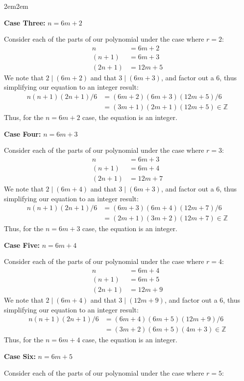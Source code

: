 \documentclass[10pt,oneside]{book}
\newcommand{\Z}{\mathbb{Z}}\newcommand{\R}{\mathbb{R}}\newcommand{\N}{\mathbb{N}}
\newcommand{\centerit}[1]{{\begin{center} #1 \end{center}}}
\let\endoldproof\endproof
\renewenvironment{proof}[1][\proofname]
  {\vspace{0.2cm}\begin{adjustwidth}{2em}{2em}
   \oldproof[#1]}
  {\endoldproof
   \end{adjustwidth}}
\begin{document}
\begin{enumerate}
\begin{proof}
		\centerit{\textbf{Case Three: }$n = 6m + 2$}
		Consider each of the parts of our polynomial under the case where $r = 2$:
		\begin{align*}
			n &= 6m +2\\
			(n+1)&= 6m+3\\
			(2n+1)&= 12m+5
		\end{align*}
		We note that $2\mid (6m+2)$ and that $3\mid (6m+3)$, and factor out a 6, thus simplifying our equation to an integer result:
		\begin{align*}
			n(n+1)(2n+1)/6 &= (6m+2)(6m+3)(12m+5)/6\\
			&= (3m+1)(2m+1)(12m+5) \in \Z
		\end{align*}
		Thus, for the $n= 6m+2$ case, the equation is an integer. 
		\centerit{\textbf{Case Four: }$n = 6m + 3$}
		Consider each of the parts of our polynomial under the case where $r = 3$:
		\begin{align*}
			n &= 6m +3\\
			(n+1)&= 6m+4\\
			(2n+1)&= 12m+7
		\end{align*}
		We note that $2\mid (6m+4)$ and that $3\mid (6m+3)$, and factor out a 6, thus simplifying our equation to an integer result:
		\begin{align*}
			n(n+1)(2n+1)/6 &= (6m+3)(6m+4)(12m+7)/6\\
			&= (2m+1)(3m+2)(12m+7) \in \Z
		\end{align*}
		Thus, for the $n= 6m+3$ case, the equation is an integer. 
		\centerit{\textbf{Case Five: }$n = 6m + 4$}
		Consider each of the parts of our polynomial under the case where $r = 4$:
		\begin{align*}
			n &= 6m +4\\
			(n+1)&= 6m+5\\
			(2n+1)&= 12m+9
		\end{align*}
		We note that $2\mid (6m+4)$ and that $3\mid (12m+9)$, and factor out a 6, thus simplifying our equation to an integer result:
		\begin{align*}
			n(n+1)(2n+1)/6 &= (6m+4)(6m+5)(12m+9)/6\\
			&= (3m+2)(6m+5)(4m+3) \in \Z
		\end{align*}
		Thus, for the $n= 6m+4$ case, the equation is an integer. 
		\centerit{\textbf{Case Six: }$n = 6m + 5$}
		Consider each of the parts of our polynomial under the case where $r = 5$:
		\begin{align*}

\end{align*}
\end{proof}
\end{enumerate}
\end{document}
